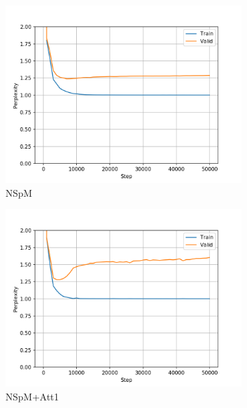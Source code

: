 \begin{figure}[H]
\centering
\begin{subfigure}{0.45\textwidth}
\includegraphics[width=\textwidth]{../results/monument2_2/run1/neural_sparql_machine/ppls.png} 
\caption{NSpM}
\label{fig:monu2 nsm ppl}
\end{subfigure}
\hfill
\begin{subfigure}{0.45\textwidth}
\includegraphics[width=\textwidth]{../results/monument2_2/run1/neural_sparql_machine_bahdanau_attention/ppls.png}
\caption{NSpM+Att1}
\label{fig:monu2 nsm-bah ppl}
\end{subfigure}
\hfill
\begin{subfigure}{0.45\textwidth}

\end{subfigure}
\end{figure}
